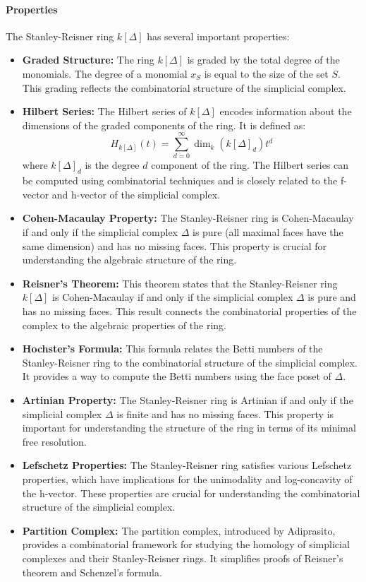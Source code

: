 \documentclass[12pt]{article}
\theoremstyle{definition}
\numberwithin{equation}{subsection}
\begin{document}
\paragraph{Properties}
The Stanley-Reisner ring $k[\Delta]$ has several important properties:
\begin{itemize}
\item \textbf{Graded Structure:} The ring $k[\Delta]$ is graded by the total degree of the monomials. The degree of a monomial $x_S$ is equal to the size of the set $S$. This grading reflects the combinatorial structure of the simplicial complex.
\item \textbf{Hilbert Series:} The Hilbert series of $k[\Delta]$ encodes information about the dimensions of the graded components of the ring. It is defined as:
\[
H_{k[\Delta]}(t) = \sum_{d=0}^{\infty} \dim_k (k[\Delta]_d) t^d
\]
where $k[\Delta]_d$ is the degree $d$ component of the ring. The Hilbert series can be computed using combinatorial techniques and is closely related to the f-vector and h-vector of the simplicial complex.
\item \textbf{Cohen-Macaulay Property:} The Stanley-Reisner ring is Cohen-Macaulay if and only if the simplicial complex $\Delta$ is pure (all maximal faces have the same dimension) and has no missing faces. This property is crucial for understanding the algebraic structure of the ring.
\item \textbf{Reisner's Theorem:} This theorem states that the Stanley-Reisner ring $k[\Delta]$ is Cohen-Macaulay if and only if the simplicial complex $\Delta$ is pure and has no missing faces. This result connects the combinatorial properties of the complex to the algebraic properties of the ring.
\item \textbf{Hochster's Formula:} This formula relates the Betti numbers of the Stanley-Reisner ring to the combinatorial structure of the simplicial complex. It provides a way to compute the Betti numbers using the face poset of $\Delta$.
\item \textbf{Artinian Property:} The Stanley-Reisner ring is Artinian if and only if the simplicial complex $\Delta$ is finite and has no missing faces. This property is important for understanding the structure of the ring in terms of its minimal free resolution.
\item \textbf{Lefschetz Properties:} The Stanley-Reisner ring satisfies various Lefschetz properties, which have implications for the unimodality and log-concavity of the h-vector. These properties are crucial for understanding the combinatorial structure of the simplicial complex.
\item \textbf{Partition Complex:} The partition complex, introduced by Adiprasito, provides a combinatorial framework for studying the homology of simplicial complexes and their Stanley-Reisner rings. It simplifies proofs of Reisner's theorem and Schenzel's formula.
\end{itemize}
\end{document}
